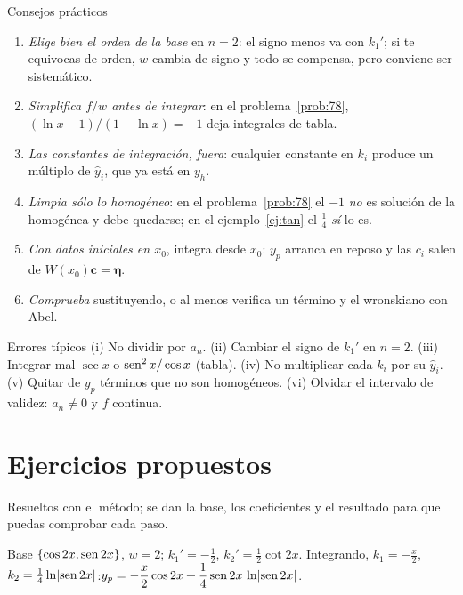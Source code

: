 \documentclass[11pt,twoside]{article}
\newcommand\yh{\hat y}
\newcommand\abs[1]{\lvert#1\rvert}
\begin{document}
\begin{consejo}{Consejos prácticos}
\begin{enumerate}[label=(\roman*),leftmargin=1.8em]
\item \emph{Elige bien el orden de la base} en $n=2$: el signo menos va con $k_1'$; si te equivocas de orden, $w$ cambia de
signo y todo se compensa, pero conviene ser sistemático.
\item \emph{Simplifica $f/w$ antes de integrar}: en el problema~\ref{prob:78}, $(\ln x-1)/(1-\ln x)=-1$ deja integrales de tabla.
\item \emph{Las constantes de integración, fuera}: cualquier constante en $k_i$ produce un múltiplo de $\yh_i$, que ya está en
$y_h$.
\item \emph{Limpia sólo lo homogéneo}: en el problema~\ref{prob:78} el $-1$ \emph{no} es solución de la homogénea y debe
quedarse; en el ejemplo~\ref{ej:tan} el $\frac14$ \emph{sí} lo es.
\item \emph{Con datos iniciales en $x_0$}, integra desde $x_0$: $y_p$ arranca en reposo y las $c_i$ salen de $W(x_0)\bm c=\bm\eta$.
\item \emph{Comprueba} sustituyendo, o al menos verifica un término y el wronskiano con Abel.
\end{enumerate}
\end{consejo}

\begin{nota}{Errores típicos}
(i) No dividir por $a_n$. (ii) Cambiar el signo de $k_1'$ en $n=2$. (iii) Integrar mal $\sec x$ o $\operatorname{sen}^2x/\cos x$ (tabla).
(iv) No multiplicar cada $k_i$ por su $\yh_i$. (v) Quitar de $y_p$ términos que no son homogéneos. (vi) Olvidar el
intervalo de validez: $a_n\neq0$ y $f$ continua.
\end{nota}

\section{Ejercicios propuestos}\label{sec:propuestos}

Resueltos con el método; se dan la base, los coeficientes y el resultado para que puedas comprobar cada paso.

\begin{problema}[$y''+4y=\csc2x$]\label{prop:1}
\end{problema}
\begin{resolucion}
Base $\{\cos2x,\operatorname{sen}2x\}$, $w=2$; $k_1'=-\frac12$, $k_2'=\frac12\cot2x$. Integrando, $k_1=-\frac x2$,
$k_2=\frac14\ln\abs{\sen2x}$:\quad $y_p=-\dfrac x2\cos2x+\dfrac14\sen2x\,\ln\abs{\sen2x}$.
\end{resolucion}
\end{document}
